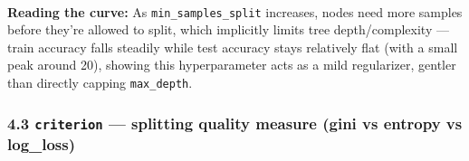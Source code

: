 \documentclass[11pt]{article}
\begin{document}
    \begin{center}
    \end{center}
    { \hspace*{\fill} \\}
    
    \textbf{Reading the curve:} As \texttt{min\_samples\_split} increases,
nodes need more samples before they're allowed to split, which
implicitly limits tree depth/complexity --- train accuracy falls
steadily while test accuracy stays relatively flat (with a small peak
around 20), showing this hyperparameter acts as a mild regularizer,
gentler than directly capping \texttt{max\_depth}.

    \subsubsection{\texorpdfstring{4.3 \texttt{criterion} --- splitting
quality measure (gini vs entropy vs
log\_loss)}{4.3 criterion --- splitting quality measure (gini vs entropy vs log\_loss)}}\label{criterion-splitting-quality-measure-gini-vs-entropy-vs-log_loss}
\end{document}

